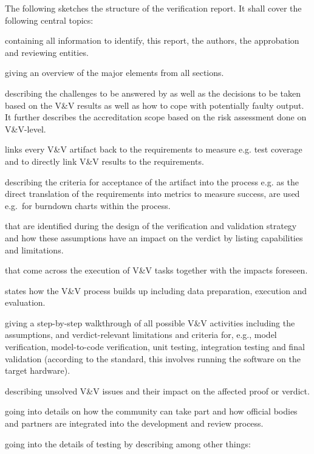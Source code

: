 \documentclass{template/openetcs_report}
\begin{document}
The following sketches the structure of the verification report. It
shall cover the following central topics:
\begin{description}\setlength{\parsep}{0pt}\setlength{\itemsep}{0pt}\setlength{\topsep}{0pt}
\item[Header] containing all information to identify, this report, the
  authors, the approbation and reviewing entities.
\item[Executive Summary] giving an overview of the major elements from
  all sections. 
\item[Problem Statement] describing the challenges to be answered by
  \VV as well as the decisions to be taken based on the V\&V results
  as well as how to cope with potentially faulty output. It further
  describes the accreditation scope based on the risk assessment done
  on V\&V-level. 
\item[V\&V Requirements Traceability Matrix] links every V\&V artifact
  back to the requirements to measure e.g. test coverage and to
  directly link V\&V results to the requirements. 
\item[Acceptability Criteria,] describing the criteria for acceptance
  of the artifact into the \VV process e.g. as the direct translation
  of the requirements into metrics to measure success, are used
  e.g.\ for burndown charts within the process. 
\item[Assumptions] that are identified during the design of the
  verification and validation strategy and how these assumptions have
  an impact on the verdict by listing capabilities and limitations. 
\item[Risks and Impacts] that come across the execution of V\&V tasks
  together with the impacts foreseen. 
\item[V\&V Design] states how the V\&V process builds up including
  data preparation, execution and evaluation. 
\item[V\&V Methodologies] giving a step-by-step walkthrough of all
  possible V\&V activities including the assumptions, and
  verdict-relevant limitations and criteria for, e.g.,  model
  verification, model-to-code verification, unit testing, integration
  testing and final validation (according to the standard, this
  involves running the software on the target hardware).  
\item[V\&V Issues] describing unsolved V\&V issues and their impact on
  the affected proof or verdict. 
\item[Peer Reviews] going into details on how the community can take
  part and how official bodies and partners are integrated into the
  development and review process. 
\item[Test Plan Definition] going into the details of testing by
  describing among other things: 


\end{description}
\end{document}
